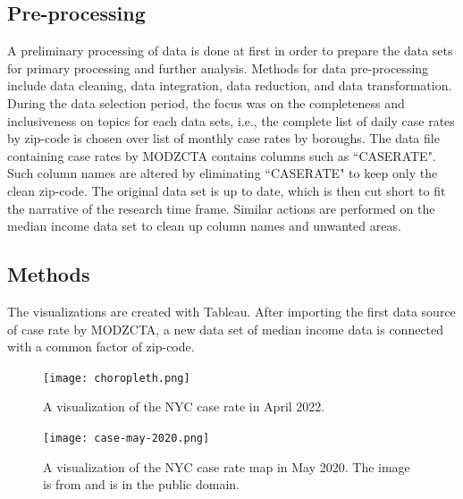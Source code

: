 \documentclass{vgtc}                 %
\begin{document}
\subsection{Pre-processing}

A preliminary processing of data is done at first in order to prepare the data sets for primary processing and further analysis. Methods for data pre-processing include data cleaning, data integration, data reduction, and data transformation. During the data selection period, the focus was on the completeness and inclusiveness on topics for each data sets, i.e., the complete list of daily case rates by zip-code is chosen over list of monthly case rates by boroughs.  The data file containing case rates by MODZCTA contains columns such as ``CASERATE". Such column names are altered by eliminating ``CASERATE\textunderscore" to keep only the clean zip-code. The original data set is up to date, which is then cut short to fit the narrative of the research time frame. Similar actions are performed on the median income data set to clean up column names and unwanted areas. 

\subsection{Methods}

The visualizations are created with Tableau. After importing the first data source of case rate by MODZCTA, a new data set of median income data is connected with a common factor of zip-code. 


\begin{figure}[tb]
 \centering %
 \texttt{[image: choropleth.png]}
 \caption{A visualization of the NYC case rate in April 2022.}
 \label{fig:sample}
\end{figure}

\begin{figure}[tb]
 \centering %
 \texttt{[image: case-may-2020.png]}
 \caption{A visualization of the NYC case rate map in May 2020. The image is from \cite{Carrión:2021:NLD} and is in the public domain.}
 \label{fig:sample}
\end{figure}
\end{document}
